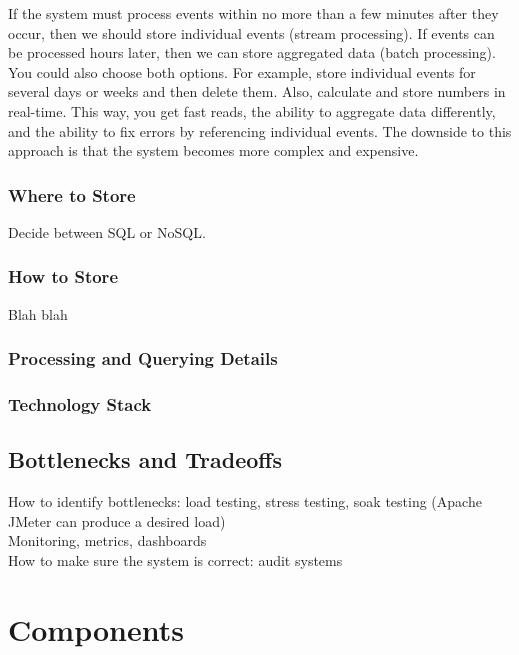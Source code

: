 \documentclass[12pt, titlepage]{article}
\begin{document}
If the system must process events within no more than a few minutes after they occur, then we should store individual events (stream processing). If events can be processed hours later, then we can store aggregated data (batch processing). \\

You could also choose both options. For example, store individual events for several days or weeks and then delete them. Also, calculate and store numbers in real-time. This way, you get fast reads, the ability to aggregate data differently, and the ability to fix errors by referencing individual events. The downside to this approach is that the system becomes more complex and expensive.

\subsubsection{Where to Store}

Decide between SQL or NoSQL.

\subsubsection{How to Store}

Blah blah

\subsubsection{Processing and Querying Details}

\subsubsection{Technology Stack}

\subsection{Bottlenecks and Tradeoffs}

How to identify bottlenecks: load testing, stress testing, soak testing (Apache JMeter can produce a desired load) \\

Monitoring, metrics, dashboards \\

How to make sure the system is correct: audit systems \\

\section{Components}
\end{document}
